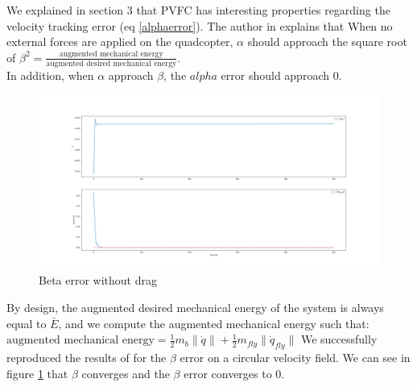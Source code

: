 We explained in section 3 that PVFC has interesting properties regarding the velocity tracking error (eq \ref{alphaerror}). 
The author in \cite{li1999passive} explains that When no external forces are applied on the quadcopter, $\alpha$ should approach the square root of $\beta^2 = \frac{\text{augmented mechanical energy}}{\text{augmented desired mechanical energy}}$.\\
In addition, when $\alpha$ approach $\beta$, the $alpha$ error should approach 0.

\begin{figure}[h!]
   \centering
   \includegraphics[width=\linewidth, scale=1.5]{Images/betaerrornodrag.png}
   \caption{Beta error without drag}
   \label{fig:betaerrornodrag}
\end{figure}
By design, the augmented desired mechanical energy of the system is always equal to $\bar{E}$, and we compute the augmented mechanical energy such that:\\ $\text{augmented mechanical energy} = \frac{1}{2}m_b\lVert\dot{q}\rVert + \frac{1}{2}m_{fly}\lVert\dot{q}_{fly}\rVert $
We successfully reproduced the results of \cite{li1999passive} for the $\beta$ error on a circular velocity field. We can see in figure \ref{fig:betaerrornodrag} that $\beta$ converges and the $\beta$ error converges to 0.

